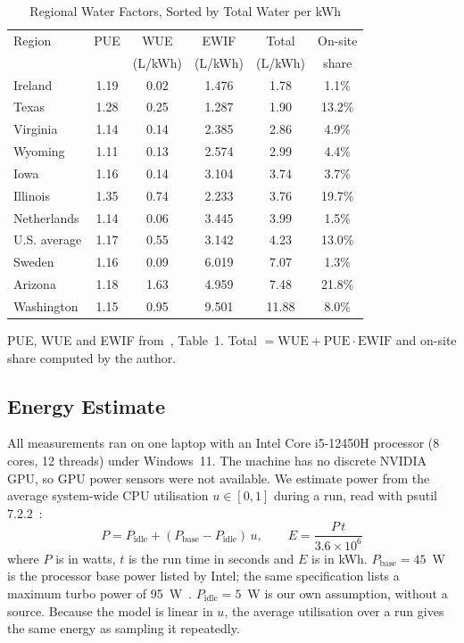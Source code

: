 \documentclass[conference]{IEEEtran}
\begin{document}
\begin{table}[t]
\caption{Regional Water Factors, Sorted by Total Water per kWh}
\label{tab:factors}
\centering
\footnotesize
\setlength{\tabcolsep}{4pt}
\begin{tabular}{@{}lccccc@{}}
\toprule
Region & PUE & WUE & EWIF & Total & On-site \\
 & & (L/kWh) & (L/kWh) & (L/kWh) & share \\
\midrule
Ireland      & 1.19 & 0.02 & 1.476 & 1.78  & 1.1\%  \\
Texas        & 1.28 & 0.25 & 1.287 & 1.90  & 13.2\% \\
Virginia     & 1.14 & 0.14 & 2.385 & 2.86  & 4.9\%  \\
Wyoming      & 1.11 & 0.13 & 2.574 & 2.99  & 4.4\%  \\
Iowa         & 1.16 & 0.14 & 3.104 & 3.74  & 3.7\%  \\
Illinois     & 1.35 & 0.74 & 2.233 & 3.76  & 19.7\% \\
Netherlands  & 1.14 & 0.06 & 3.445 & 3.99  & 1.5\%  \\
U.S. average & 1.17 & 0.55 & 3.142 & 4.23  & 13.0\% \\
Sweden       & 1.16 & 0.09 & 6.019 & 7.07  & 1.3\%  \\
Arizona      & 1.18 & 1.63 & 4.959 & 7.48  & 21.8\% \\
Washington   & 1.15 & 0.95 & 9.501 & 11.88 & 8.0\%  \\
\bottomrule
\end{tabular}

\vspace{2pt}
\parbox{\columnwidth}{\scriptsize PUE, WUE and EWIF from~\cite{li2023thirsty}, Table~1. Total $=\mathrm{WUE}+\mathrm{PUE}\cdot\mathrm{EWIF}$ and on-site share computed by the author.}
\end{table}

\subsection{Energy Estimate}

All measurements ran on one laptop with an Intel Core i5-12450H processor (8 cores, 12 threads) under Windows~11. The machine has no discrete NVIDIA GPU, so GPU power sensors were not available. We estimate power from the average system-wide CPU utilisation $u \in [0,1]$ during a run, read with psutil 7.2.2~\cite{psutil}:
\begin{equation}
P = P_{\mathrm{idle}} + (P_{\mathrm{base}} - P_{\mathrm{idle}})\,u, \qquad E = \frac{P\,t}{3.6\times10^{6}}
\label{eq:power}
\end{equation}
where $P$ is in watts, $t$ is the run time in seconds and $E$ is in kWh. $P_{\mathrm{base}} = 45$~W is the processor base power listed by Intel; the same specification lists a maximum turbo power of 95~W~\cite{intel12450h}. $P_{\mathrm{idle}} = 5$~W is our own assumption, without a source. Because the model is linear in $u$, the average utilisation over a run gives the same energy as sampling it repeatedly.
\end{document}
